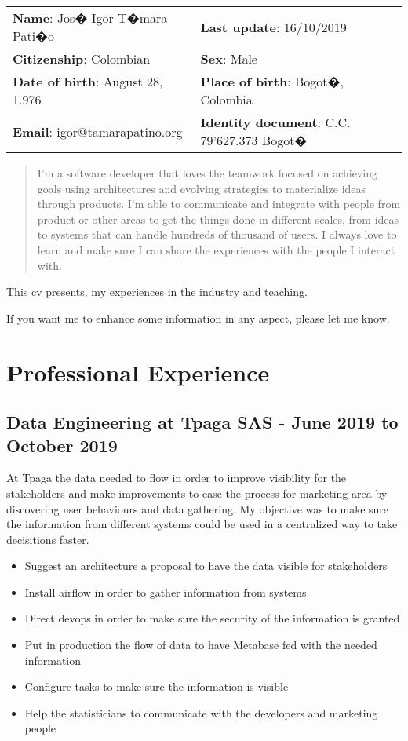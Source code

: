 \documentclass{article}
\begin{document}
\begin{longtable}{p{10cm}p{7cm}}
\noindent \textbf{Name}: Jos� Igor T�mara Pati�o & \textbf{Last update}: 16/10/2019 \\
\textbf{Citizenship}: Colombian & \textbf{Sex}: Male \\
\textbf{Date of birth}: August 28, 1.976 &\textbf{Place of birth}: Bogot�, Colombia \\
\textbf{Email}: igor@tamarapatino.org & \textbf{Identity document}: C.C. 79'627.373 Bogot� \\
\end{longtable}
\begin{abstract}
\normalsize
I'm a software developer that loves the teamwork focused on achieving goals using architectures and evolving strategies to materialize ideas through products.  I'm able to communicate and integrate with people from product or other areas to get the things done in different scales, from ideas to systems that can handle hundreds of thousand of users.  I always love to learn and make sure I can share the experiences with the people I interact with.  
\end{abstract}


This cv presents, my experiences in the industry and teaching.

If you want me to enhance some information in any aspect, please let
me know.

\section{Professional Experience}


\subsection{Data Engineering at Tpaga SAS - June 2019 to October 2019}
\label{sec:tpagadata}

At Tpaga the data needed to flow in order to improve visibility for the
stakeholders and make improvements to ease the process for marketing area
by discovering user behaviours and data gathering.  My objective was to
make sure the information from different systems could be used in a centralized
way to take decisitions faster.

\begin{itemize}
  \item Suggest an architecture a proposal to have the data visible for stakeholders
  \item Install airflow in order to gather information from systems
  \item Direct devops in order to make sure the security of the information is granted
  \item Put in production the flow of data to have Metabase fed with the needed information
  \item Configure tasks to make sure the information is visible
  \item Help the statisticians to communicate with the developers and marketing people
\end{itemize}
\end{document}
